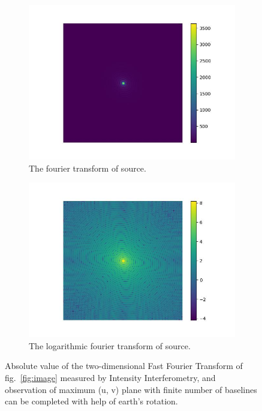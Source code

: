 \documentclass[fleqn,usenatbib,twocolumn]{mnras}
\begin{document}
\begin{figure}
	\centering
	\begin{subfigure}{0.5\linewidth}
		\includegraphics[width=\linewidth]{fig/ft/ft.jpg}
		\caption{The fourier transform of source.}
	\end{subfigure}\hfill
	\begin{subfigure}{0.5\linewidth}
		\includegraphics[width=\linewidth]{fig/ft/ft_log.jpg}
		\caption{The logarithmic fourier transform of source.}
	\end{subfigure}
	\caption{Absolute value of the two-dimensional Fast Fourier Transform of fig.~\ref{fig:image} measured by Intensity Interferometry, and observation of maximum (u, v) plane with finite number of baselines can be completed with help of earth's rotation.}
	\label{fig:ft}
\end{figure}
\end{document}
